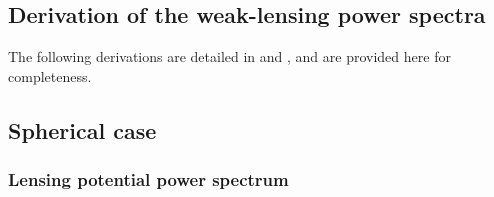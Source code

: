 \documentclass[fleqn,usenatbib]{mnras} %
\begin{document}



\begin{appendix}

\section{Derivation of the weak-lensing power spectra}
\label{sec:derivations_C}

The following derivations are detailed in \cite{2000PhRvD..62d3007H} and
\cite{2005PhRvD..72b3516C}, and are provided here for completeness.

\subsection{Spherical case}

\subsubsection{Lensing potential power spectrum}


\end{appendix}
\end{document}

